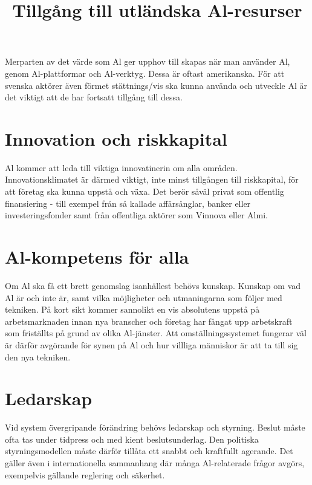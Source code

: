 {\title{
Tillgång till utländska Al-resurser
}
Merparten av det värde som Al ger upphov till skapas när man använder Al, genom Al-plattformar och Al-verktyg. Dessa är oftast amerikanska. För att svenska aktörer även förmet stättnings/vis ska kunna använda och utveckle Al är det viktigt att de har fortsatt tillgång till dessa.
\section*{Innovation och riskkapital}
Al kommer att leda till viktiga innovatinerin om alla områden. Innovationsklimatet är därmed viktigt, inte minst tillgången till riskkapital, för att företag ska kunna uppstå och växa. Det berör såväl privat som offentlig finansiering - till exempel från så kallade affärsånglar, banker eller investeringsfonder samt från offentliga aktörer som Vinnova eller Almi.
\section*{Al-kompetens för alla}
Om Al ska få ett brett genomslag isanhällest behövs kunskap. Kunskap om vad Al är och inte är, samt vilka möjligheter och utmaningarna som följer med tekniken. På kort sikt kommer sannolikt en vis absolutens uppstå på arbetsmarknaden innan nya branscher och företag har fångat upp arbetskraft som friställts på grund av olika Al-jänster. Att omställningssystemet fungerar väl är därför avgörande för synen på Al och hur villliga människor är att ta till sig den nya tekniken.
\section*{Ledarskap}
Vid system övergripande förändring behövs ledarskap och styrning. Beslut måste ofta tas under tidpress och med kient beslutsunderlag. Den politiska styrningsmodellen måste därför tillåta ett snabbt och kraftfullt agerande. Det gäller även i internationella sammanhang där många Al-relaterade frågor avgörs, exempelvis gällande reglering och säkerhet.
}
